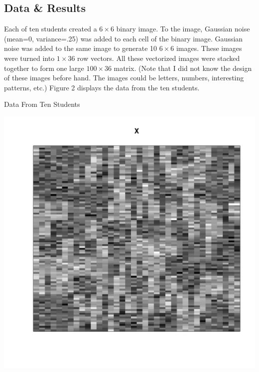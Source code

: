 \subsection{Data \& Results}
Each of ten students created a $6 \times 6$ binary image. To the
image, Gaussian noise (mean=0, variance=.25) was added to each cell of the
binary image. Gaussian noise was added to the same image to generate 10 $6
\times 6$ images. These images were turned into $1 \times 36$ row vectors. All
these vectorized images were stacked together to form one large $100 \times 36$
matrix. (Note that I did not know the design of these images before hand. The
images could be letters, numbers, interesting patterns, etc.)
Figure 2 displays the data from the ten students.\\

\beginmyfig
  \vspace{-5mm}
  \caption{Data From Ten Students}
  \vspace{-2mm}
  \includegraphics{images/Y.pdf}
  \vspace{-15mm}
\endmyfig

